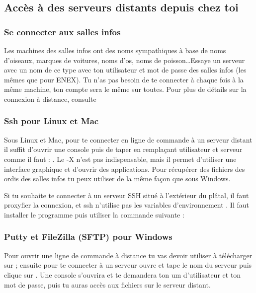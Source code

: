 \subsection{Accès à des serveurs distants depuis chez toi}

\subsubsection{Se connecter aux salles infos}

Les machines des salles infos ont des noms sympathiques à base de noms d'oiseaux, marques de voitures, noms d'os, noms de poisson\dots Essaye un serveur avec un nom de ce type avec ton utilisateur et mot de passe des salles infos (les mêmes que pour ENEX). Tu n'as pas besoin de te connecter à chaque fois à la même machine, ton compte sera le même sur toutes. Pour plus de détails sur la connexion à distance, consulte \newline {} 



\subsubsection{Ssh pour Linux et Mac}

Sous Linux et Mac, pour te connecter en ligne de commande à un serveur distant il suffit d'ouvrir une console puis de taper en remplaçant utilisateur et serveur comme il faut : . Le -X n'est pas indispensable, mais il permet d'utiliser une interface graphique et d'ouvrir des applications. Pour récupérer des fichiers des ordis des salles infos tu peux utiliser  de la même façon que sous Windows.

Si tu souhaite te connecter à un serveur SSH situé à l'extérieur du plâtal, il faut proxyfier la connexion, et ssh n'utilise pas les variables d'environnement . Il faut installer le programme  puis utiliser la commande suivante :

\subsubsection{Putty et FileZilla (SFTP) pour Windows}

Pour ouvrir une ligne de commande à distance tu vas devoir utiliser  à télécharger sur  ;
ensuite pour te connecter à un serveur ouvre  et tape le nom du serveur puis clique sur .
Une console s'ouvrira et te demandera ton um d'utilisateur et ton mot de passe, puis tu auras accès aux fichiers sur le serveur distant.

